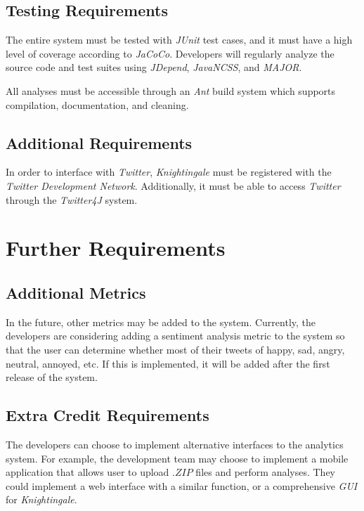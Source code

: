 \documentclass[a4paper, 12pt]{article}
\begin{document}
\subsection{Testing Requirements} \label{sec:testing}
\begin{adjustwidth}{2em}{0pt}
The entire system must be tested with \textit{JUnit} test cases, and it must have a high level of coverage according to \textit{JaCoCo}. Developers will regularly analyze the source code and test suites using \textit{JDepend}, \textit{JavaNCSS}, and \textit{MAJOR}. \newline 

\noindent All analyses must be accessible through an \textit{Ant} build system which supports compilation, documentation, and cleaning.
\end{adjustwidth}

\subsection{Additional Requirements} \label{sec:additional}
\begin{adjustwidth}{2em}{0pt}
In order to interface with \textit{Twitter}, \textit{Knightingale} must be registered with the \textit{Twitter Development Network}. Additionally, it must be able to access \textit{Twitter} through the \textit{Twitter4J} system.
\end{adjustwidth}

\section{Further Requirements} \label{sec:further}
\subsection{Additional Metrics} \label{sec:metrics}
\begin{adjustwidth}{2em}{0pt}
In the future, other metrics may be added to the system. Currently, the developers are considering adding a sentiment analysis metric to the system so that the user can determine whether most of their tweets of happy, sad, angry, neutral, annoyed, etc. If this is implemented, it will be added after the first release of the system.
\end{adjustwidth}

\subsection{Extra Credit Requirements} \label{sec:extracredit}
\begin{adjustwidth}{2em}{0pt}
The developers can choose to implement alternative interfaces to the analytics system. For example, the development team may choose to implement a mobile application that allows user to upload $.ZIP$ files and perform analyses. They could implement a web interface with a similar function, or a comprehensive \textit{GUI} for \textit{Knightingale}. 
\end{adjustwidth}
\end{document}
